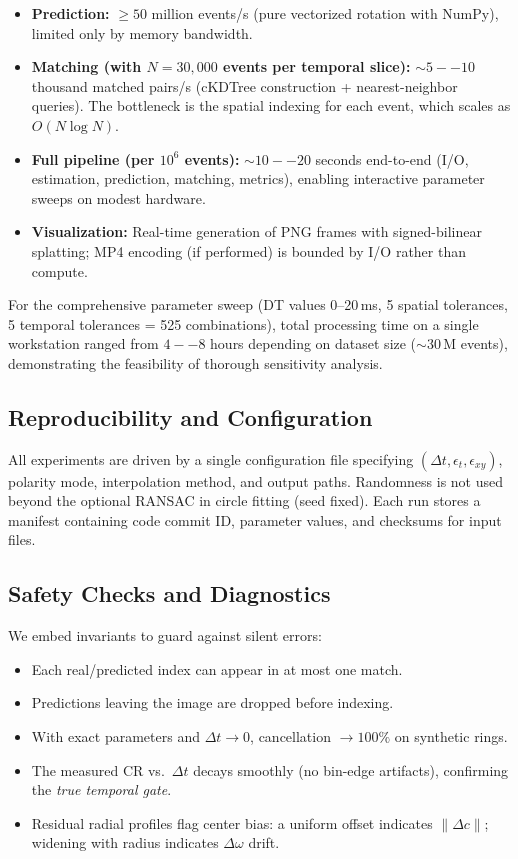 \begin{itemize}
  \item \textbf{Prediction:} $\geq 50$ million events/s (pure vectorized rotation with NumPy), limited only by memory bandwidth.
  \item \textbf{Matching (with $N=30,000$ events per temporal slice):} $\sim 5--10$ thousand matched pairs/s (cKDTree construction + nearest-neighbor queries). The bottleneck is the spatial indexing for each event, which scales as $O(N \log N)$.
  \item \textbf{Full pipeline (per $10^6$ events):} $\sim 10--20$ seconds end-to-end (I/O, estimation, prediction, matching, metrics), enabling interactive parameter sweeps on modest hardware.
  \item \textbf{Visualization:} Real-time generation of PNG frames with signed-bilinear splatting; MP4 encoding (if performed) is bounded by I/O rather than compute.
\end{itemize}

For the comprehensive parameter sweep (DT values 0--20\,ms, 5 spatial tolerances, 5 temporal tolerances = 525 combinations), total processing time on a single workstation ranged from $4--8$ hours depending on dataset size ($\sim 30$\,M events), demonstrating the feasibility of thorough sensitivity analysis.

\subsection{Reproducibility and Configuration}
All experiments are driven by a single configuration file specifying $(\Delta t,\epsilon_t,\epsilon_{xy})$, polarity mode, interpolation method, and output paths. Randomness is not used beyond the optional RANSAC in circle fitting (seed fixed). Each run stores a manifest containing code commit ID, parameter values, and checksums for input files.

\subsection{Safety Checks and Diagnostics}
We embed invariants to guard against silent errors:
\begin{itemize}
  \item Each real/predicted index can appear in at most one match.
  \item Predictions leaving the image are dropped before indexing.
  \item With exact parameters and $\Delta t\to 0$, cancellation $\to 100\%$ on synthetic rings.
  \item The measured CR vs.\ $\Delta t$ decays smoothly (no bin-edge artifacts), confirming the \emph{true temporal gate}.
  \item Residual radial profiles flag center bias: a uniform offset indicates $\|\Delta c\|$; widening with radius indicates $\Delta\omega$ drift.
\end{itemize}

